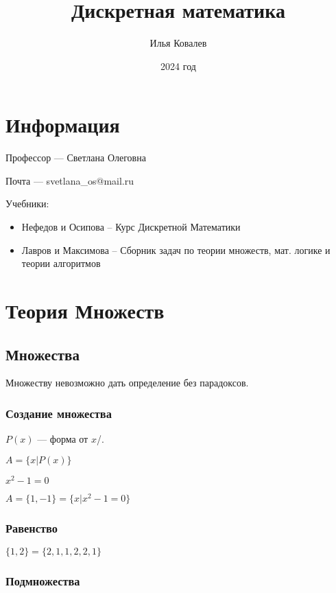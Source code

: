 \documentclass{article}
\begin{document}
\title{Дискретная математика}
\author{Илья Ковалев}
\date{2024 год}
\maketitle

\section{Информация}

Профессор --- Светлана Олеговна

Почта --- svetlana\_os@mail.ru

Учебники:

\begin{itemize}
	\item Нефедов и Осипова -- Курс Дискретной Математики
	\item Лавров и Максимова -- Сборник задач по теории множеств, мат. логике и теории алгоритмов
\end{itemize}

\section{Теория Множеств}

\subsection{Множества}

Множеству невозможно дать определение без парадоксов.

\subsubsection{Создание множества}

$P(x)$ --- форма от $x$/.

$A = \{x | P(x)\}$

$x^2 - 1 = 0$

$A = \{1, -1\} = \{x | x^2 - 1 = 0\}$

\subsubsection{Равенство}

$\{1, 2\} = \{2, 1, 1, 2, 2, 1\}$

\subsubsection{Подмножества}
\end{document}
